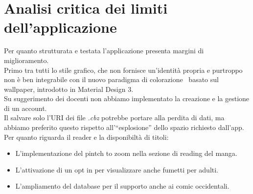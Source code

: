 \documentclass[../Assignment-3-LPSMT.tex]{subfiles}
\begin{document}
\chapter{Analisi critica dei limiti dell’applicazione}

Per quanto strutturata e testata l'applicazione presenta margini di miglioramento.\\
Primo tra tutti lo stile grafico, che non fornisce un'identità propria e purtroppo non è ben integrabile con il nuovo paradigma di colorazione~\cite{matDesColor} basato sul wallpaper, introdotto in Material Design 3.\\
Su suggerimento dei docenti non abbiamo implementato la creazione e la gestione di un account.\\
Il salvare solo l'URI dei file \emph{.cbz} potrebbe portare alla perdita di dati, ma abbiamo preferito questo rispetto all'``esplosione'' dello spazio richiesto dall'app.\\
Per quanto riguarda il reader e la disponibiltà di titoli:
\begin{itemize}
  \item L'implementazione del pintch to zoom nella sezione di reading del manga.
  \item L'attivazione di un opt in per visualizzare anche fumetti per adulti.
  \item L'ampliamento del database per il supporto anche ai comic occidentali.
\end{itemize}
\end{document}
